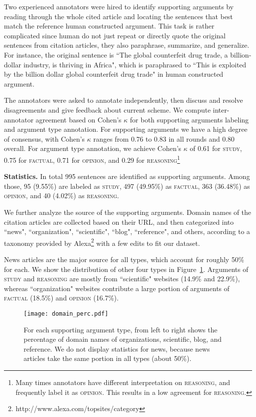 Two experienced annotators were hired to identify supporting arguments by reading through the whole cited article and locating the sentences that best match the reference human constructed argument. 
This task is rather complicated since human do not just repeat or directly quote the original sentences from citation articles, they also paraphrase, summarize, and generalize. 
For instance, the original sentence is ``The global counterfeit drug trade, a billion-dollar industry, is thriving in Africa", which is paraphrased to ``This is exploited by the billion dollar global counterfeit drug trade" in human constructed argument.  



The annotators were asked to annotate independently, then discuss and resolve disagreements and give feedback about current scheme. 
We compute inter-annotator agreement based on Cohen's $\kappa$ for both supporting arguments labeling and argument type annotation. For supporting arguments we have a high degree of consensus, with Cohen's $\kappa$ ranges from 0.76 to 0.83 in all rounds and 0.80 overall. 
For argument type annotation, we achieve Cohen's $\kappa$ of 0.61 for \textsc{study}, 0.75 for \textsc{factual}, 0.71 for \textsc{opinion}, and 0.29 for \textsc{reasoning}\footnote{Many times annotators have different interpretation on \textsc{reasoning}, and frequently label it as \textsc{opinion}. This results in a low agreement for \textsc{reasoning}.}

\noindent \textbf{Statistics.} 
In total 995 sentences are identified as supporting arguments. 
Among those, 95 (9.55\%) are labeled as \textsc{study}, 497 (49.95\%) as \textsc{factual}, 363 (36.48\%) as \textsc{opinion}, and 40 (4.02\%) as \textsc{reasoning}. 


We further analyze the source of the supporting arguments. Domain names of the citation articles are collected based on their URL, and then categorized into ``news", ``organization", ``scientific", ``blog", ``reference", and others, according to a taxonomy provided by Alexa\footnote{http://www.alexa.com/topsites/category} with a few edits to fit our dataset. 

News articles are the major source for all types, which account for roughly 50\% for each. We show the distribution of other four types in Figure~\ref{fig:type_domain_distribution}. 
Arguments of \textsc{study} and \textsc{reasoning} are mostly from ``scientific" websites (14.9\% and 22.9\%), whereas ``organization" websites contribute a large portion of arguments of \textsc{factual} (18.5\%) and \textsc{opinion} (16.7\%).

\begin{figure}
    \hspace{-5mm}
    \texttt{[image: domain\_perc.pdf]}
    \vspace{-7mm}
    \caption{\fontsize{10}{12}\selectfont For each supporting argument type, from left to right shows the percentage of domain names of organizations, scientific, blog, and reference. We do not display statistics for news, because news articles take the same portion in all types (about 50\%).}
    \label{fig:type_domain_distribution}
\end{figure}
